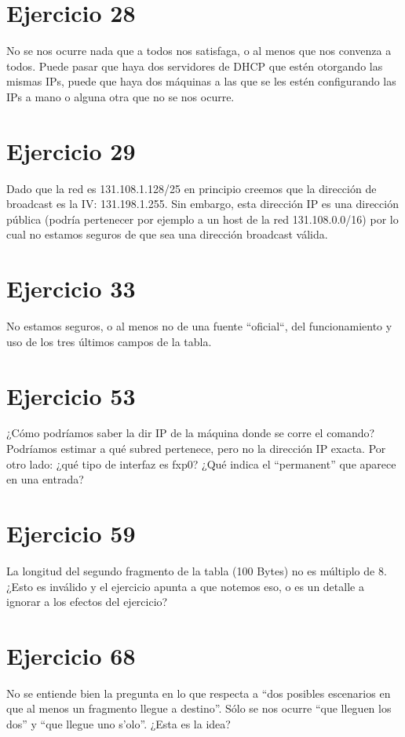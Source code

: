 \documentclass[a4paper,10pt]{article}
\begin{document}
\section*{Ejercicio 28}
No se nos ocurre nada que a todos nos satisfaga, o al menos que nos convenza a todos.  Puede pasar que haya dos servidores de DHCP que estén otorgando las mismas IPs, puede que haya dos máquinas a las que se les estén configurando las IPs a mano o alguna otra que no se nos ocurre.

\section*{Ejercicio 29}
Dado que la red es 131.108.1.128/25 en principio creemos que la dirección de broadcast es la IV: 131.198.1.255.  Sin embargo, esta dirección IP es una dirección pública (podría pertenecer por ejemplo a un host de la red 131.108.0.0/16) por lo cual no estamos seguros de que sea una dirección broadcast válida.

\section*{Ejercicio 33}
No estamos seguros, o al menos no de una fuente ``oficial``, del funcionamiento y uso de los tres últimos campos de la tabla.

\section*{Ejercicio 53}
¿Cómo podríamos saber la dir IP de la máquina donde se corre el comando?  Podríamos estimar a qué subred pertenece, pero no la dirección IP exacta.
Por otro lado: ¿qué tipo de interfaz es fxp0? ¿Qué indica el ``permanent'' que aparece en una entrada?

\section*{Ejercicio 59}
La longitud del segundo fragmento de la tabla (100 Bytes) no es múltiplo de 8.  ¿Esto es inválido y el ejercicio apunta a que notemos eso, o es un detalle a ignorar a los efectos del ejercicio?

\section*{Ejercicio 68}
No se entiende bien la pregunta en lo que respecta a ``dos posibles escenarios en que al menos un fragmento llegue a destino''.  Sólo se nos ocurre ``que lleguen los dos'' y ``que llegue uno s'olo''.  ¿Esta es la idea?
\end{document}
